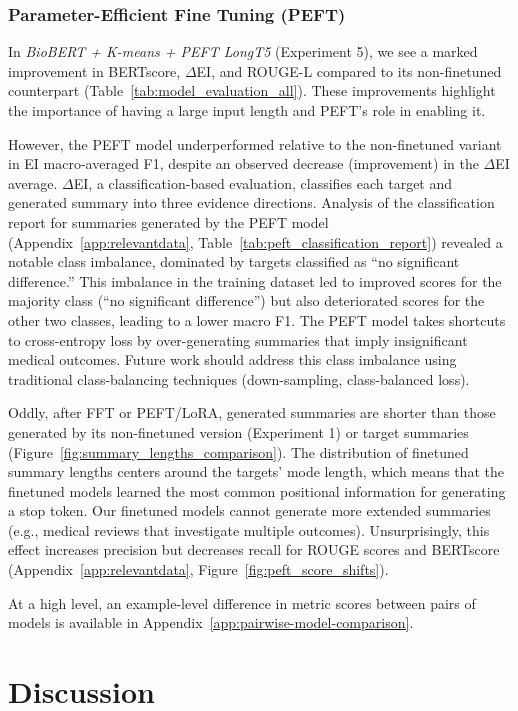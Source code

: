 \documentclass[11pt]{article}
\begin{document}
\subsubsection{Parameter-Efficient Fine Tuning (PEFT)}

In \textit{BioBERT + K-means + PEFT LongT5} (Experiment 5), we see a marked improvement in BERTscore, $\Delta$EI, and ROUGE-L compared to its non-finetuned counterpart (Table~\ref{tab:model_evaluation_all}). These improvements highlight the importance of having a large input length and PEFT’s role in enabling it.

However, the PEFT model underperformed relative to the non-finetuned variant in EI macro-averaged F1, despite an observed decrease (improvement) in the $\Delta$EI average. $\Delta$EI, a classification-based evaluation, classifies each target and generated summary into three evidence directions. Analysis of the classification report for summaries generated by the PEFT model (Appendix~\ref{app:relevantdata}, Table~\ref{tab:peft_classification_report}) revealed a notable class imbalance, dominated by targets classified as “no significant difference.” This imbalance in the training dataset led to improved scores for the majority class (“no significant difference”) but also deteriorated scores for the other two classes, leading to a lower macro F1. The PEFT model takes shortcuts to cross-entropy loss by over-generating summaries that imply insignificant medical outcomes. Future work should address this class imbalance using traditional class-balancing techniques (down-sampling, class-balanced loss).

Oddly, after FFT or PEFT/LoRA, generated summaries are shorter than those generated by its non-finetuned version (Experiment 1) or target summaries (Figure~\ref{fig:summary_lengths_comparison}). The distribution of finetuned summary lengths centers around the targets’ mode length, which means that the finetuned models learned the most common positional information for generating a stop token. Our finetuned models cannot generate more extended summaries (e.g., medical reviews that investigate multiple outcomes). Unsurprisingly, this effect increases precision but decreases recall for ROUGE scores and BERTscore (Appendix~\ref{app:relevantdata}, Figure~\ref{fig:peft_score_shifts}).

At a high level, an example-level difference in metric scores between pairs of models is available in Appendix~\ref{app:pairwise-model-comparison}.

\section{Discussion}
\end{document}
